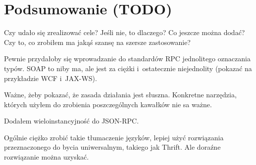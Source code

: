 \chapter{Podsumowanie (TODO)}
Czy udało się zrealizować cele? Jeśli nie, to dlaczego? Co jeszcze można dodać? Czy to, co zrobiłem ma jakąś szansę na szersze zastosowanie?

Pewnie przydałoby się wprowadzanie do standardów RPC jednolitego oznaczania typów. SOAP to niby ma, ale jest za ciężki i~ostatecznie niejednolity (pokazać na przykładzie WCF i~JAX-WS).

Ważne, żeby pokazać, że zasada działania jest słuszna. Konkretne narzędzia, których użyłem do zrobienia poszczególnych kawałków nie sa ważne.

Dodałem wieloinstancyjność do JSON-RPC.

Ogólnie ciężko zrobić takie tłumaczenie języków, lepiej użyć rozwiązania przeznaczonego do bycia uniwersalnym, takiego jak Thrift.
Ale doraźne rozwiązanie można uzyskać.

%


